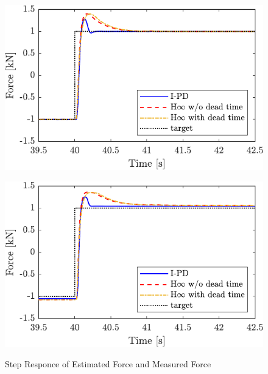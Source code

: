 \begin{figure}[t]
    \begin{minipage}{\minipageratio\hsize}
    \centering
        \includegraphics[keepaspectratio, scale = \minifigscale]{contents/ForceControl/figure/1115/crop-1115_diff_estforce_step.pdf}
        \label{fig4:crop-1115_diff_estforce_step}
    \end{minipage} 
    \begin{minipage}{\minipageratio\hsize}
    \centering
        \includegraphics[keepaspectratio, scale = \minifigscale]{contents/ForceControl/figure/1115/crop-1115_diff_force_step.pdf}
        \label{fig4:crop-1115_diff_force_step}
    \end{minipage}
    \caption{Step Responce of Estimated Force and Measured Force}
    \label{fig4:crop-1115_diff_step}
\end{figure}
